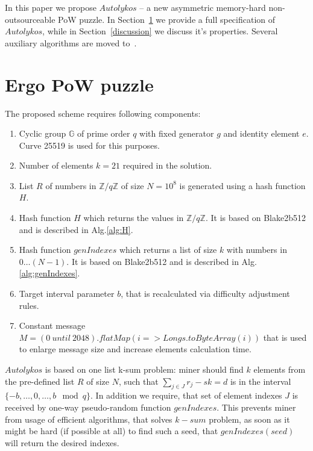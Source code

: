 \documentclass[]{article}
\newcommand{\Name}{$Autolykos$}
\begin{document}
    In this paper we propose \Name{} -- a new asymmetric memory-hard non-outsourceable PoW puzzle.
    In Section~\ref{puzzle} we provide a full
    specification of \Name, while in Section~\ref{discussion} we discuss it's
    properties. Several auxiliary algorithms are moved to~.

    \section{Ergo PoW puzzle}
    \label{puzzle}

    The proposed scheme requires following components:
    \begin{enumerate}
        \item Cyclic group $\mathbb{G}$ of prime order $q$ with fixed generator $g$
        and identity element $e$.
        Curve 25519 is used for this purposes.
        \item Number of elements $k=21$ required in the solution.
        \item List $R$ of numbers in $\mathbb{Z}/q\mathbb{Z}$ of size $N=10^{8}$ is generated
        using a hash function $H$.
        \item Hash function $H$ which returns the values in $\mathbb{Z}/q\mathbb{Z}$.
        It is based on Blake2b512 and is described in Alg.\ref{alg:H}.
        \item Hash function $genIndexes$ which returns a list of size $k$ with numbers in $0\dots (N-1)$.
        It is based on Blake2b512 and is described in Alg.\ref{alg:genIndexes}.
        \item Target interval parameter $b$, that is recalculated via difficulty adjustment rules.
        \item Constant message $M=(0~until~2048).flatMap(i => Longs.toByteArray(i))$ that is used to enlarge message size and increase elements calculation time.
    \end{enumerate}

    \Name{} is based on one list k-sum problem: miner should find
    $k$ elements from the pre-defined list $R$ of size $N$, such that
    $\sum_{j \in J} r_{j} - sk = d$ is in the interval $\{-b,\dots,0,\dots,b\mod q\}$.
    In addition we require, that set of element indexes $J$ is received
    by one-way pseudo-random function $genIndexes$. This prevents miner
    from usage of efficient algorithms, that solves $k-sum$ problem, as
    soon as it might be hard (if possible at all) to find such a seed,
    that $genIndexes(seed)$ will return the desired indexes.
\end{document}
